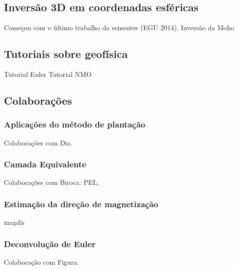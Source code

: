 \subsection{Inversão 3D em coordenadas esféricas}


Começou com o último trabalho da sementes (EGU 2014).
Inversão da Moho


\subsection{Tutoriais sobre geofísica}

Tutorial Euler
Tutorial NMO


\subsection{Colaborações}


\subsubsection{Aplicações do método de plantação}

Colaborações com Dio.


\subsubsection{Camada Equivalente}

Colaborações com Biroca: PEL,


\subsubsection{Estimação da direção de magnetização}

magdir


\subsubsection{Deconvolução de Euler}

Colaboração com Figura.
